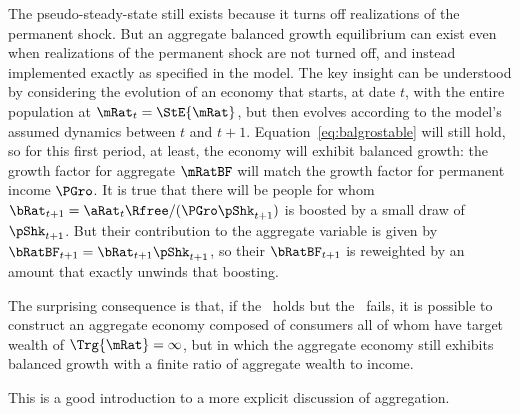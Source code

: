 \documentclass[BufferStockTheory]{subfiles}
\begin{document}
The pseudo-steady-state still exists because it turns off realizations of the permanent shock.  But an aggregate balanced growth equilibrium can exist even when realizations of the permanent shock are not turned off, and instead implemented exactly as specified in the model.  The key insight can be understood by considering the evolution of an economy that starts, at date $t$, with the entire population at $\mRat_{t}=\StE{\mRat}$, but then evolves according to the model's assumed dynamics between $t$ and $t+1$.  Equation~\eqref{eq:balgrostable} will still hold, so for this first period, at least, the economy will exhibit balanced growth: the growth factor for aggregate $\mRatBF$ will match the growth factor for permanent income $\PGro$.  It is true that there will be people for whom $\bRat_{t+1}=\aRat_{t}\Rfree/(\PGro\pShk_{t+1})$ is boosted by a small draw of $\pShk_{t+1}$.  But their contribution to the aggregate variable is given by $\bRatBF_{t+1}=\bRat_{t+1}\pShk_{t+1}$, so their $\bRatBF_{t+1}$ is reweighted by an amount that exactly unwinds that boosting.

The surprising consequence is that, if the {\GICRaw}~holds but the {\GICNrm}~fails, it is possible to construct an aggregate economy composed of consumers all of whom have target wealth of $\Trg{\mRat}=\infty$, but in which the aggregate economy still exhibits balanced growth with a finite ratio of aggregate wealth to income.  %

This is a good introduction to a more explicit discussion of aggregation.
\end{document}
